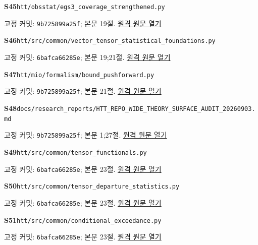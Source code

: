 \documentclass[11pt,a4paper]{article}
\begin{document}
\hypertarget{src:S45}{}\textbf{S45}\quad \nolinkurl{htt/obsstat/egs3_coverage_strengthened.py}\par
{\small 고정 커밋: \texttt{9b725899a25f}; 본문 19절. \href{https://github.com/cosmosapjw-quantum/htt_base/blob/9b725899a25fa410e7c3686ce36afaa667d14646/htt/obsstat/egs3_coverage_strengthened.py}{원격 원문 열기}}\par
\hypertarget{src:S46}{}\textbf{S46}\quad \nolinkurl{htt/src/common/vector_tensor_statistical_foundations.py}\par
{\small 고정 커밋: \texttt{6bafca66285e}; 본문 19;21절. \href{https://github.com/cosmosapjw-quantum/htt_base/blob/6bafca66285ef071081453313bb7d2d6b261599c/htt/src/common/vector_tensor_statistical_foundations.py}{원격 원문 열기}}\par
\hypertarget{src:S47}{}\textbf{S47}\quad \nolinkurl{htt/mio/formalism/bound_pushforward.py}\par
{\small 고정 커밋: \texttt{9b725899a25f}; 본문 21절. \href{https://github.com/cosmosapjw-quantum/htt_base/blob/9b725899a25fa410e7c3686ce36afaa667d14646/htt/mio/formalism/bound_pushforward.py}{원격 원문 열기}}\par
\hypertarget{src:S48}{}\textbf{S48}\quad \nolinkurl{docs/research_reports/HTT_REPO_WIDE_THEORY_SURFACE_AUDIT_20260903.md}\par
{\small 고정 커밋: \texttt{9b725899a25f}; 본문 1;27절. \href{https://github.com/cosmosapjw-quantum/htt_base/blob/9b725899a25fa410e7c3686ce36afaa667d14646/docs/research_reports/HTT_REPO_WIDE_THEORY_SURFACE_AUDIT_20260903.md}{원격 원문 열기}}\par
\hypertarget{src:S49}{}\textbf{S49}\quad \nolinkurl{htt/src/common/tensor_functionals.py}\par
{\small 고정 커밋: \texttt{6bafca66285e}; 본문 23절. \href{https://github.com/cosmosapjw-quantum/htt_base/blob/6bafca66285ef071081453313bb7d2d6b261599c/htt/src/common/tensor_functionals.py}{원격 원문 열기}}\par
\hypertarget{src:S50}{}\textbf{S50}\quad \nolinkurl{htt/src/common/tensor_departure_statistics.py}\par
{\small 고정 커밋: \texttt{6bafca66285e}; 본문 23절. \href{https://github.com/cosmosapjw-quantum/htt_base/blob/6bafca66285ef071081453313bb7d2d6b261599c/htt/src/common/tensor_departure_statistics.py}{원격 원문 열기}}\par
\hypertarget{src:S51}{}\textbf{S51}\quad \nolinkurl{htt/src/common/conditional_exceedance.py}\par
{\small 고정 커밋: \texttt{6bafca66285e}; 본문 23절. \href{https://github.com/cosmosapjw-quantum/htt_base/blob/6bafca66285ef071081453313bb7d2d6b261599c/htt/src/common/conditional_exceedance.py}{원격 원문 열기}}\par
\end{document}
